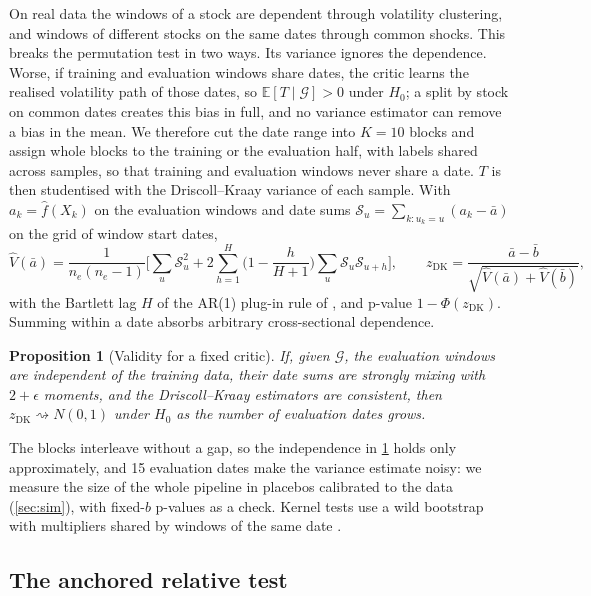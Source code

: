 \documentclass[11pt,a4paper]{article}
\theoremstyle{plain}
\newtheorem{proposition}{Proposition}
\newcommand{\E}{\mathbb{E}}
\newcommand{\Gsig}{\mathcal{G}}
\newcommand{\dto}{\rightsquigarrow}
\newcommand{\fhat}{\widehat{f}}
\newcommand{\zhac}{z_{\mathrm{DK}}}
\begin{document}
On real data the windows of a stock are dependent through volatility clustering, and windows of
different stocks on the same dates through common shocks. This breaks the permutation test in two
ways. Its variance ignores the dependence. Worse, if training and evaluation windows share dates,
the critic learns the realised volatility path of those dates, so $\E[T\mid\Gsig]>0$ under $H_0$;
a split by stock on common dates creates this bias in full, and no variance estimator can remove a
bias in the mean. We therefore cut the date range into $K=10$ blocks and assign whole blocks to the
training or the evaluation half, with labels shared across samples, so that training and evaluation
windows never share a date. $T$ is then studentised with the Driscoll--Kraay variance
\citep{driscoll1998consistent} of each sample. With $a_k=\fhat(X_k)$ on the evaluation windows and
date sums $\mathcal S_u=\sum_{k:u_k=u}(a_k-\bar a)$ on the grid of window start dates,
\begin{equation}\label{eq:dk}
  \widehat V(\bar a)=\frac{1}{n_e(n_e-1)}\Big[\sum_u\mathcal S_u^2
  +2\sum_{h=1}^{H}\Big(1-\frac{h}{H+1}\Big)\sum_u\mathcal S_u\mathcal S_{u+h}\Big],\qquad
  \zhac=\frac{\bar a-\bar b}{\sqrt{\widehat V(\bar a)+\widehat V(\bar b)}},
\end{equation}
with the Bartlett lag $H$ of the AR(1) plug-in rule of \citet{andrews1991heteroskedasticity}, and
p-value $1-\Phi(\zhac)$. Summing within a date absorbs arbitrary cross-sectional dependence.

\begin{proposition}[Validity for a fixed critic]\label{prop:dk}
If, given $\Gsig$, the evaluation windows are independent of the training data, their date sums
are strongly mixing with $2+\epsilon$ moments, and the Driscoll--Kraay estimators are consistent,
then $\zhac\dto N(0,1)$ under $H_0$ as the number of evaluation dates grows.
\end{proposition}

The blocks interleave without a gap, so the independence in \cref{prop:dk} holds only
approximately, and 15 evaluation dates make the variance estimate noisy: we measure the size of the
whole pipeline in placebos calibrated to the data (\cref{sec:sim}), with fixed-$b$ p-values
\citep{kiefer_2005_new} as a check. Kernel tests use a wild bootstrap with multipliers shared by
windows of the same date \citep{chwialkowski2014wild}.

\subsection{The anchored relative test}\label{sec:method-anchored}
\end{document}
